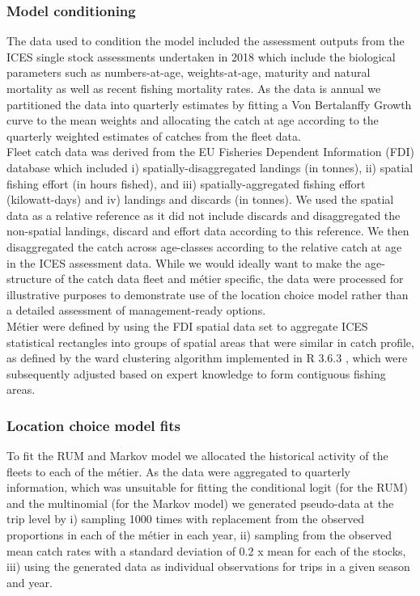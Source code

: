 \documentclass[12pt, halfline, a4paper]{ouparticle}
\begin{document}
\subsubsection{Model conditioning}

The data used to condition the model included the assessment outputs from the
ICES single stock assessments undertaken in 2018 \citep{ICES2018} which include
the biological parameters such as numbers-at-age, weights-at-age, maturity and
natural mortality as well as recent fishing mortality rates. As the data is
annual we partitioned the data into quarterly estimates by fitting a Von
Bertalanffy Growth curve to the mean weights and allocating the catch at age
according to the quarterly weighted estimates of catches from the fleet data.
\\

Fleet catch data was derived from the EU Fisheries Dependent Information (FDI)
database \citep{STECF2017} which included i) spatially-disaggregated landings
(in tonnes), ii) spatial fishing effort (in hours fished), and iii)
spatially-aggregated fishing effort (kilowatt-days) and iv) landings and
discards (in tonnes). We used the spatial data as a relative reference as it
did not include discards and disaggregated the non-spatial landings, discard
and effort data according to this reference. We then disaggregated the catch
across age-classes according to the relative catch at age in the ICES
assessment data. While we would ideally want to make the age-structure of the
catch data fleet and métier specific, the data were processed for illustrative
purposes to demonstrate use of the location choice model rather than a detailed
assessment of management-ready options. \\

Métier were defined by using the FDI spatial data set to aggregate ICES
statistical rectangles into groups of spatial areas that were similar in catch
profile, as defined by the ward clustering algorithm implemented in R 3.6.3
\citep{Team2020}, which were subsequently adjusted based on expert knowledge to
form contiguous fishing areas. \\ 

\subsubsection{Location choice model fits}

To fit the RUM and Markov model we allocated the historical activity of the
fleets to each of the métier. As the data were aggregated to quarterly
information, which was unsuitable for fitting the conditional logit (for the
RUM) and the multinomial (for the Markov model) we generated pseudo-data at the
trip level by i) sampling 1000 times with replacement from the observed
proportions in each of the métier in each year, ii) sampling from the observed
mean catch rates with a standard deviation of 0.2 x mean for each of the
stocks, iii) using the generated data as individual observations for trips in a
given season and year. \\
\end{document}
